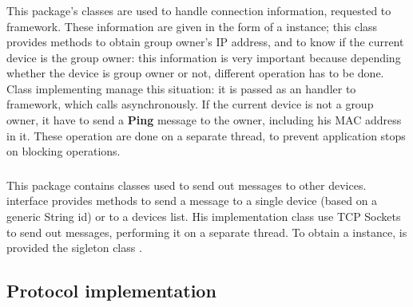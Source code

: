 	\subsubsection{}
	This package's classes are used to handle connection information, requested to \direct framework. These information are given in the form of a  instance; this class provides methods to obtain group owner's IP address, and to know if the current device is the group owner: this information is very important because depending whether the device is group owner or not, different operation has to be done. Class  implementing  manage this situation: it is passed as an handler to \direct framework, which calls  asynchronously. 
	If the current device is not a group owner, it have to send a \textbf{Ping} message to the owner, including his MAC address in it.
	These operation are done on a separate thread, to prevent application stops on blocking operations.
	\\
	\subsubsection{}
	This package contains classes used to send out messages to other devices.  interface provides methods to send a message to a single device (based on a generic String id) or to a devices list. His implementation class  use TCP Sockets to send out messages, performing it on a separate thread. To obtain a  instance, is provided the sigleton class .

\subsection{Protocol implementation}


